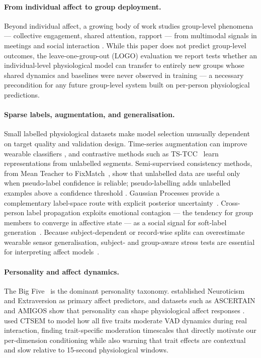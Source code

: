 \documentclass[sigconf,nonacm]{acmart}
\begin{document}
\paragraph{From individual affect to group deployment.}
Beyond individual affect, a growing body of work studies
group-level phenomena --- collective engagement, shared attention, rapport ---
from multimodal signals in meetings and social interaction
\cite{mccowan2005ami,alameda2015salsa,cabrera2018matchnmingle,sanchez2012emergent}.
While this paper does not predict group-level outcomes, the
leave-one-group-out (LOGO) evaluation we report tests whether an
individual-level physiological model can transfer to entirely new groups
whose shared dynamics and baselines were never observed in training ---
a necessary precondition for any future group-level system built on
per-person physiological predictions.

\paragraph{Sparse labels, augmentation, and generalisation.}
Small labelled physiological datasets make model selection unusually dependent
on target quality and validation design.
Time-series augmentation can improve wearable classifiers
\cite{um2017data,iwana2021augmentation}, and contrastive methods such as
TS-TCC~\cite{eldele2021tscc} learn representations from unlabelled segments.
Semi-supervised consistency methods, from Mean Teacher
\cite{tarvainen2017mean} to FixMatch~\cite{sohn2020fixmatch}, show that
unlabelled data are useful only when pseudo-label confidence is reliable;
pseudo-labelling adds unlabelled examples above a confidence threshold
\cite{lee2013pseudo}.
Gaussian Processes provide a complementary label-space route with explicit
posterior uncertainty~\cite{rasmussen2006gaussian,atcheson2017gp}.
Cross-person label propagation exploits emotional contagion --- the tendency
for group members to converge in affective state --- as a social signal for
soft-label generation~\cite{hatfield1993emotional}.
Because subject-dependent or record-wise splits can overestimate wearable
sensor generalisation, subject- and group-aware stress tests are essential
for interpreting affect models~\cite{ahmad2022survey,ventura2022validation}.

\paragraph{Personality and affect dynamics.}
The Big Five~\cite{john1999bigfive} is the dominant personality taxonomy.
\citet{watson1992traits} established Neuroticism and Extraversion as
primary affect predictors, and datasets such as ASCERTAIN and AMIGOS show
that personality can shape physiological affect responses
\cite{subramanian2018ascertain,mirandacorrea2021amigos}.
\citet{meng2026moderating} used CTSEM to model how all five traits moderate
VAD dynamics during real interaction, finding trait-specific moderation
timescales that directly motivate our per-dimension conditioning while also
warning that trait effects are contextual and slow relative to 15-second
physiological windows.
\end{document}
